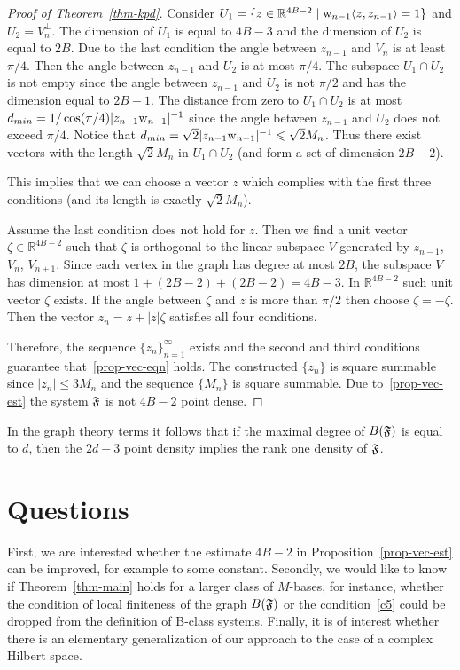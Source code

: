\documentclass[12pt,oneside,a4paper]{amsart}
\begin{document}
\begin{proof}[Proof of Theorem~\ref{thm-kpd}]
        Consider $U_1 = \{z \in \mathbb{R}^{4B-2} \mid \mathrm{w}_{n-1} \langle z, z_{n-1} \rangle = 1\}$ and $U_2 = V_n^\bot$.
        The dimension of $U_1$ is equal to $4B - 3$ and the dimension of $U_2$ is equal to $2B$.
        Due to the last condition the angle between $z_{n - 1}$ and $V_n$ is at least $\pi / 4$.
        Then the angle between $z_{n-1}$ and $U_2$ is at most $\pi / 4$.
        The subspace $U_1 \cap U_2$ is not empty since the angle between $z_{n-1}$ and $U_2$ is not $\pi/2$ and
          has the dimension equal to $2B-1$.
        The distance from zero to $U_1 \cap U_2$ is at most $d_{min} = 1/\cos(\pi/4)\lvert z_{n-1} \mathrm{w}_{n-1}\rvert^{-1}$
          since the angle between $z_{n-1}$ and $U_2$ does not exceed $\pi/4$.
        Notice that $d_{min} = \sqrt{2} \lvert z_{n-1} \mathrm{w}_{n-1} \rvert^{-1} \leqslant \sqrt{2}M_n$.
        Thus there exist vectors with the length $\sqrt{2}M_n$ in $U_1 \cap U_2$ (and form a set of dimension $2B-2$).

        This implies that we can choose a vector $z$ which complies with the first three conditions (and its length is exactly $\sqrt{2}M_n$).

        Assume the last condition does not hold for $z$.
        Then we find a unit vector $\zeta \in \mathbb{R}^{4B - 2}$ such that $\zeta$ is orthogonal to the linear subspace $V$ generated by
          $z_{n-1}$, $V_{n}$, $V_{n + 1}$.
        Since each vertex in the graph has degree at most $2B$, the subspace $V$ has dimension at most $1 + (2B - 2) + (2B - 2) = 4B - 3$.
        In $\mathbb{R}^{4B-2}$ such unit vector $\zeta$ exists.
        If the angle between $\zeta$ and $z$ is more than $\pi/2$ then choose $\zeta = -\zeta$.
        Then the vector $z_n = z + \lvert z \rvert \zeta$ satisfies all four conditions.

        Therefore, the sequence $\{z_n\}_{n=1}^\infty$ exists and the second and third conditions guarantee that~\eqref{prop-vec-eqn} holds.
        The constructed $\{z_n\}$ is square summable since $\lvert z_n \rvert \leq 3M_n$ and the sequence $\{M_n\}$ is square summable.
        Due to~\eqref{prop-vec-est} the system $\mathfrak{F}$ is not $4B - 2$ point dense.
      \end{proof}
      \begin{remark*}
        In the graph theory terms it follows that if the maximal degree of $B(\mathfrak{F})$ is equal to $d$,
          then the $2d - 3$ point density implies the rank one density of $\mathfrak{F}$.
      \end{remark*}
  \bigskip
  \section{Questions}
    First, we are interested whether the estimate $4B - 2$ in Proposition~\eqref{prop-vec-est} can be improved, for example to some constant.
    Secondly, we would like to know if Theorem~\ref{thm-main} holds for a larger class of $M$-bases, for instance, whether the condition of
      local finiteness of the graph $B(\mathfrak{F})$ or the condition~\ref{c5} could be dropped from the definition of B-class systems.
    Finally, it is of interest whether there is an elementary generalization of our approach to the case of a complex Hilbert space.
\end{document}
